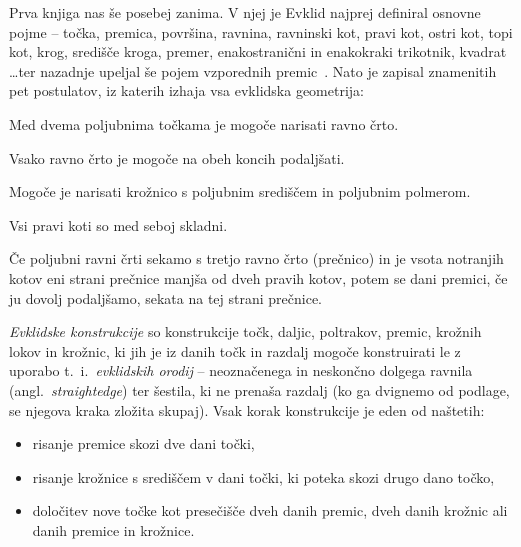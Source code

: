 Prva knjiga nas še posebej zanima. V njej je Evklid najprej definiral osnovne pojme -- točka, premica, površina, ravnina, ravninski kot, pravi kot, ostri kot, topi kot, krog, središče kroga, premer, enakostranični in enakokraki trikotnik, kvadrat \ldots ter nazadnje upeljal še pojem vzporednih premic~\cite{euclidI}. Nato je zapisal znamenitih pet postulatov, iz katerih izhaja vsa evklidska geometrija:

\renewcommand{\thepostulat}{P\arabic{postulat}}

\begin{postulat}
    \label{post:P1}
    Med dvema poljubnima točkama je mogoče narisati ravno črto.
\end{postulat}
\begin{postulat}
    \label{post:P2}
    Vsako ravno črto je mogoče na obeh koncih podaljšati.
\end{postulat}
\begin{postulat}
    \label{post:P3}
    Mogoče je narisati krožnico s poljubnim središčem in poljubnim polmerom.
\end{postulat}
\begin{postulat}
    \label{post:P4}
    Vsi pravi koti so med seboj skladni.
\end{postulat}
\begin{postulat}
    \label{post:P5}
    Če poljubni ravni črti sekamo s tretjo ravno črto (prečnico) in je vsota notranjih kotov eni strani prečnice manjša od dveh pravih kotov, potem se dani premici, če ju dovolj podaljšamo, sekata na tej strani prečnice.
\end{postulat}

\begin{definicija}
    \label{def:evklidske_konstrukcije}
    \emph{Evklidske konstrukcije} so konstrukcije točk, daljic, poltrakov, premic, krožnih lokov in krožnic, ki jih je iz danih točk in razdalj mogoče konstruirati le z uporabo t.\ i.\ \emph{evklidskih orodij} -- neoznačenega in neskončno dolgega ravnila (angl.\ \emph{straightedge}) ter šestila, ki ne prenaša razdalj (ko ga dvignemo od podlage, se njegova kraka zložita skupaj). Vsak korak konstrukcije je eden od naštetih:
    \begin{itemize}
        \item risanje premice skozi dve dani točki,
        \item risanje krožnice s središčem v dani točki, ki poteka skozi drugo dano točko,
        \item določitev nove točke kot presečišče dveh danih premic, dveh danih krožnic ali danih premice in krožnice.
    \end{itemize}
\end{definicija}

